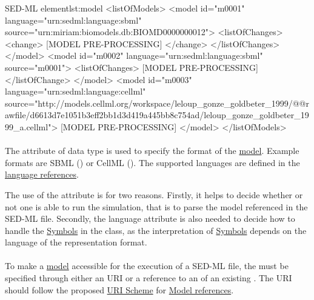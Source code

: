 \begin{myXmlLst}{SED-ML  element}{lst:model}
<listOfModels>
	<model id="m0001" language="urn:sedml:language:sbml" 
		source="urn:miriam:biomodels.db:BIOMD0000000012">
		<listOfChanges>
			<change>
				[MODEL PRE-PROCESSING]
			</change>
		</listOfChanges> 
	</model>
	<model id="m0002" language="urn:sedml:language:sbml" source="m0001">
		<listOfChanges>
			[MODEL PRE-PROCESSING]
		</listOfChange>
	</model>
	<model id="m0003" language="urn:sedml:language:cellml" source="http://models.cellml.org/workspace/leloup_gonze_goldbeter_1999/@@rawfile/d6613d7e1051b3eff2bb1d3d419a445bb8c754ad/leloup_gonze_goldbeter_1999_a.cellml">
		[MODEL PRE-PROCESSING]
	</model>
</listOfModels>
\end{myXmlLst} 

\paragraph*{}
\label{sec:language}
The   attribute of data type \hyperref[type:anyURI]{} is used to specify the format of the \hyperref[class:model]{model}. Example formats are SBML () or CellML (). The supported languages are defined in the \hyperref[sec:languageURI]{language references}.

The use of the  attribute is  for two reasons. Firstly, it helps to decide whether or not one is able to run the simulation, that is to parse the model referenced in the SED-ML file. Secondly, the language attribute is also needed to decide how to handle the \hyperref[sec:implicitVariable]{Symbols} in the \Variable class, as the interpretation of \hyperref[sec:implicitVariable]{Symbols} depends on the language of the representation format.


\paragraph*{}
\label{sec:model_source}
To make a \hyperref[class:model]{model} accessible for the execution of a SED-ML file, the  must be specified through either an URI or a reference to an  of an existing \Model. The URI should follow the proposed \hyperref[sec:uriScheme]{URI Scheme} for \hyperref[sec:modelURI]{Model references}.

